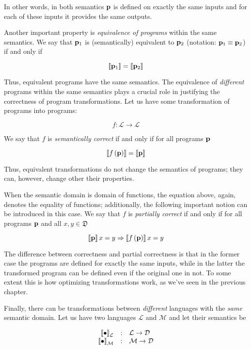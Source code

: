 In other words, in both semantics $\mathbf{p}$ is defined on exactly the same inputs and for each of these inputs it provides the same outputs.

Another important property is \emph{equivalence of programs} within the same semantics. We say that $\mathbf{p}_1$ is (semantically) equivalent to $\mathbf{p}_2$
(notation: $\mathbf{p}_1\equiv\mathbf{p}_2$) if and only if

\[
\llbracket{\mathbf{p}_1}\rrbracket=\llbracket{\mathbf{p}_2}\rrbracket
\]

Thus, equivalent programs have the same semantics. The equivalence of \emph{different} programs within the same semantics plays a crucial
role in justifying the correctness of program transformations. Let us have some transformation of programs into programs:

\[
f : \mathcal{L}\to\mathcal{L}
\]

We say that $f$ is \emph{semantically correct} if and only if for all programs $\mathbf{p}$

\[
\llbracket{f\,(\mathbf{p})}\rrbracket=\llbracket{\mathbf{p}}\rrbracket
\]

Thus, equivalent transformations do not change the semantics of programs; they can, however, change other their properties.

When the semantic domain is domain of functions, the equation above, again, denotes the equality of functions; additionally,
the following important notion can be introduced in this case. We say that $f$ is \emph{partially correct} if and only if
for all programs $\mathbf{p}$ and all $x, y\in\mathfrak{D}$

\[
\llbracket{\mathbf{p}}\rrbracket\,x=y\Rightarrow\llbracket{f\,(\mathbf{p})}\rrbracket\,x=y
\]

The difference between correctness and partial correctness is that in the former case the programs are defined for exactly the same inputs,
while in the latter the transformed program can be defined even if the original one in not. To some extent this is how
optimizing transformations work, as we've seen in the previous chapter.

Finally, there can be transformations between \emph{different} languages with the \emph{same} semantic domain. Let us have two languages $\mathcal{L}$ and $\mathcal{M}$
and let their semantics be

\[
\begin{array}{rcl}
  \sembr{\bullet}^\ph_\mathcal{L} & : & \mathcal{L}\to\mathcal{D}\\
  \sembr{\bullet}^\ph_\mathcal{M} & : & \mathcal{M}\to\mathcal{D}
\end{array}
\]

